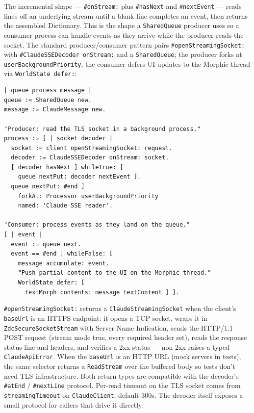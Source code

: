 \documentclass[a4paper,10pt,fleqn]{article}
\newcommand{\cls}[1]{\texttt{#1}}
\newcommand{\sel}[1]{\texttt{\##1}}
\begin{document}
The incremental shape --- \sel{onStream:} plus \sel{hasNext}
and \sel{nextEvent} --- reads lines off an underlying stream
until a blank line completes an event, then returns the
assembled Dictionary.  This is the shape a \cls{SharedQueue}
producer uses so a consumer process can handle events as they
arrive while the producer reads the socket.  The standard
producer/consumer pattern pairs \sel{openStreamingSocket:}
with \sel{ClaudeSSEDecoder onStream:} and a \cls{SharedQueue};
the producer forks at \texttt{userBackgroundPriority}, the
consumer defers UI updates to the Morphic thread via
\texttt{WorldState defer:}:

\begin{lstlisting}[language={}]
| queue process message |
queue := SharedQueue new.
message := ClaudeMessage new.

"Producer: read the TLS socket in a background process."
process := [ | socket decoder |
  socket := client openStreamingSocket: request.
  decoder := ClaudeSSEDecoder onStream: socket.
  [ decoder hasNext ] whileTrue: [
    queue nextPut: decoder nextEvent ].
  queue nextPut: #end ]
    forkAt: Processor userBackgroundPriority
    named: 'Claude SSE reader'.

"Consumer: process events as they land on the queue."
[ | event |
  event := queue next.
  event == #end ] whileFalse: [
    message accumulate: event.
    "Push partial content to the UI on the Morphic thread."
    WorldState defer: [
      textMorph contents: message textContent ] ].
\end{lstlisting}

\sel{openStreamingSocket:} returns a \cls{ClaudeStreamingSocket}
when the client's \texttt{baseUrl} is an HTTPS endpoint: it
opens a TCP socket, wraps it in \cls{ZdcSecureSocketStream}
with Server Name Indication, sends the HTTP/1.1 POST request
(stream mode true, every required header set), reads the
response status line and headers, and verifies a 2xx status ---
non-2xx raises a typed \cls{ClaudeApiError}.  When the
\texttt{baseUrl} is an HTTP URL (mock servers in tests), the
same selector returns a \cls{ReadStream} over the buffered
body so tests don't need TLS infrastructure.  Both return
types are compatible with the decoder's
\sel{atEnd} / \sel{nextLine} protocol.  Per-read timeout on
the TLS socket comes from \texttt{streamingTimeout} on
\cls{ClaudeClient}, default 300s.  The decoder itself exposes a
small protocol for callers that drive it directly:
\end{document}
